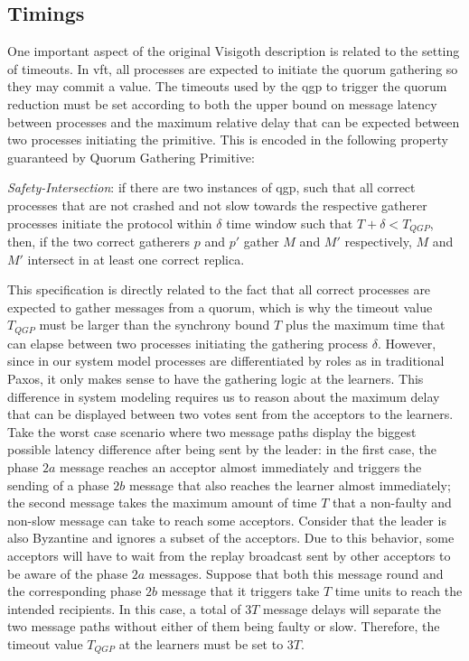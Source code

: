 \subsection{Timings}

One important aspect of the original Visigoth description is related to the setting of timeouts. In \acrshort{vft}, all processes are expected to initiate the quorum gathering so they may commit a value. The timeouts used by the \acrlong{qgp} to trigger the quorum reduction must be set according to both the upper bound on message latency between processes and the maximum relative delay that can be expected between two processes initiating the primitive. This is encoded in the following property guaranteed by Quorum Gathering Primitive: \par

\begin{displayquote}
\textit{Safety-Intersection}: if there are two instances of \acrshort{qgp}, such that all correct processes that are not crashed and not slow towards the respective gatherer processes initiate the protocol within $\delta$ time window such that $T+\delta < T_{QGP}$, then, if the two correct gatherers $p$ and $p'$ gather $M$ and $M'$ respectively, $M$ and $M'$ intersect in at least one correct replica.
\end{displayquote}

This specification is directly related to the fact that all correct processes are expected to gather messages from a quorum, which is why the timeout value $T_{QGP}$ must be larger than the synchrony bound $T$ plus the maximum time that can elapse between two processes initiating the gathering process $\delta$. However, since in our system model processes are differentiated by roles as in traditional Paxos, it only makes sense to have the gathering logic at the learners. This difference in system modeling requires us to reason about the maximum delay that can be displayed between two votes sent from the acceptors to the learners. Take the worst case scenario where two message paths display the biggest possible latency difference after being sent by the leader: in the first case, the phase $2a$ message reaches an acceptor almost immediately and triggers the sending of a phase $2b$ message that also reaches the learner almost immediately; the second message takes the maximum amount of time $T$ that a non-faulty and non-slow message can take to reach some acceptors. Consider that the leader is also Byzantine and ignores a subset of the acceptors. Due to this behavior, some acceptors will have to wait from the replay broadcast sent by other acceptors to be aware of the phase $2a$ messages. Suppose that both this message round and the corresponding phase $2b$ message that it triggers take $T$ time units to reach the intended recipients. In this case, a total of $3T$ message delays will separate the two message paths without either of them being faulty or slow. Therefore, the timeout value $T_{QGP}$ at the learners must be set to $3T$.